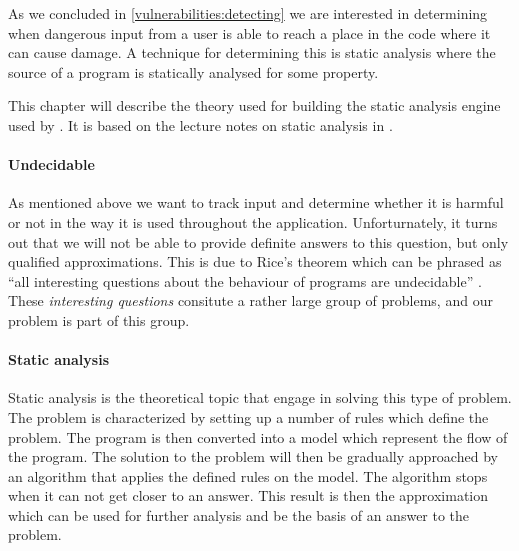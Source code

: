 As we concluded in \cref{vulnerabilities:detecting}  we are interested in determining when dangerous input from a user is able to reach a place in the code where it can cause damage.
A technique for determining this is static analysis where the source of a program is statically analysed for some property.

This chapter will describe the theory used for building the static analysis engine used by \pyt{}.
It is based on the lecture notes on static analysis in \citet{schwartzbach}.

\paragraph{Undecidable}\label{theory_intro}
As mentioned above we want to track input and determine whether it is harmful or not in the way it is used throughout the application.
Unforturnately, it turns out that we will not be able to provide definite answers to this question, but only qualified approximations.
This is due to Rice's theorem which can be phrased as ``all interesting questions about the behaviour of programs are undecidable'' \citep[p.~3]{schwartzbach}.
These \emph{interesting questions} consitute a rather large group of problems, and our problem is part of this group.

\paragraph{Static analysis}
Static analysis is the theoretical topic that engage in solving this type of problem.
The problem is characterized by setting up a number of rules which define the problem.
The program is then converted into a model which represent the flow of the program.
The solution to the problem will then be gradually approached by an algorithm that applies the defined rules on the model.
The algorithm stops when it can not get closer to an answer.
This result is then the approximation which can be used for further analysis and be the basis of an answer to the problem.

